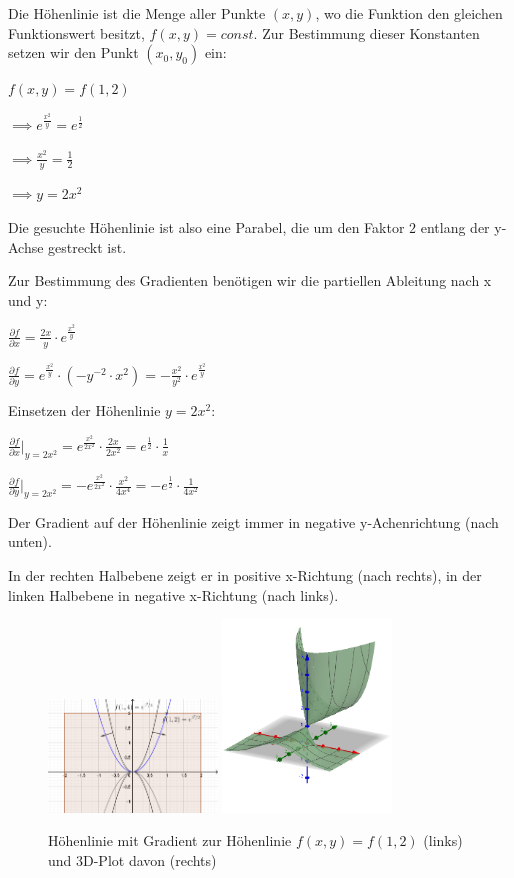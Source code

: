 \item 

Die Höhenlinie ist die Menge aller Punkte $(x,y)$, wo die Funktion den gleichen Funktionswert besitzt, $f(x,y) = const.$ Zur Bestimmung dieser Konstanten setzen wir den Punkt $(x_0,y_0)$ ein:

$f(x,y) = f(1,2)$

$\implies e^{\frac{x^2}{y}} = e^{\frac{1}{2}}$

$\implies \frac{x^2}{y} = \frac{1}{2}$

$\implies y = 2x^2$

Die gesuchte Höhenlinie ist also eine Parabel, die um den Faktor $2$ entlang der y-Achse gestreckt ist.

Zur Bestimmung des Gradienten benötigen wir die partiellen Ableitung nach x und y:

$\frac{\partial f}{\partial x} =  \frac{2x}{y} \cdot e^{\frac{x^2}{y}}$

$\frac{\partial f}{\partial y} =  e^{\frac{x^2}{y}} \cdot (-y^{-2} \cdot x^2) = - \frac{x^2}{y^2} \cdot e^{\frac{x^2}{y}} $

Einsetzen der Höhenlinie $y=2x^2$:

$\frac{\partial f}{\partial x}|_{y=2x^2}=  e^{\frac{x^2}{2x^2}} \cdot \frac{2x}{2x^2} = e^{\frac{1}{2}}\cdot \frac{1}{x}$

$\frac{\partial f}{\partial y}|_{y=2x^2} =  -e^{\frac{x^2}{2x^2}} \cdot \frac{x^2}{4x^4} = -e^{\frac{1}{2}}\cdot \frac{1}{4x^2}$

Der Gradient auf der Höhenlinie zeigt immer in negative y-Achenrichtung (nach unten).

In der rechten Halbebene zeigt er in positive x-Richtung (nach rechts), in der linken Halbebene in negative x-Richtung (nach links).

\begin{figure}[ht]
\centering
  \includegraphics[width=0.4\textwidth]{../tex-snippets/ex-graph-contour-1-img-a.png}
  \includegraphics[width=0.4\textwidth]{../tex-snippets/ex-graph-contour-1-img-b.png}
  \caption{Höhenlinie mit Gradient zur Höhenlinie $f(x,y)=f(1,2)$ (links) und 3D-Plot davon (rechts)}
\end{figure}

